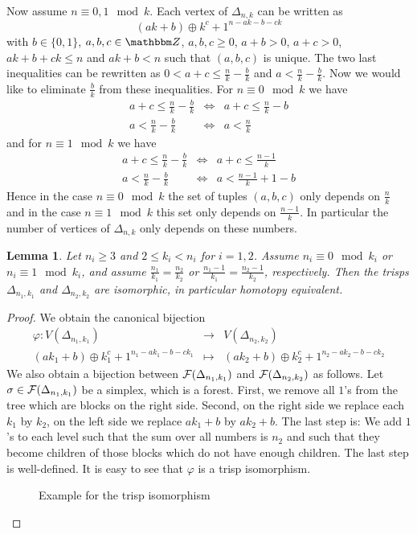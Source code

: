 \documentclass{elsarticle}
\newtheorem{lem}[df]{Lemma}
\def\Z{\mathbbm Z}
\begin{document}
Now assume $n\equiv 0,1\mod k$. Each vertex of $\Delta_{n,k}$ can be written as
\[(ak+b)\oplus k^c+1^{n-ak-b-ck}\]
with $b\in\{0,1\}$, $a,b,c\in\Z$, $a,b,c\geq 0$, $a+b>0$, $a+c>0$, $ak+b+ck\leq n$ and $ak+b<n$ such that $(a,b,c)$ is unique. The two last inequalities can be rewritten as $0<a+c\leq\frac nk-\frac bk$ and $a<\frac nk-\frac bk$. Now we would like to eliminate $\frac bk$ from these inequalities. For $n\equiv 0\mod k$ we have
\begin{eqnarray*}
a+c\leq\frac nk-\frac bk&\Leftrightarrow&a+c\leq\frac nk-b\\
a<\frac nk-\frac bk&\Leftrightarrow&a<\frac nk
\end{eqnarray*}
and for $n\equiv 1\mod k$ we have
\begin{eqnarray*}
a+c\leq\frac nk-\frac bk&\Leftrightarrow&a+c\leq\frac {n-1}k\\
a<\frac nk-\frac bk&\Leftrightarrow&a<\frac {n-1}k+1-b
\end{eqnarray*}
Hence in the case $n\equiv 0\mod k$ the set of tuples $(a,b,c)$ only depends on $\frac nk$ and in the case $n\equiv 1\mod k$ this set only depends on $\frac {n-1}k$. In particular the number of vertices of $\Delta_{n,k}$ only depends on these numbers.
\begin{lem}
\label{trispiso}
Let $n_i\geq3$ and $2\leq k_i<n_i$ for $i=1,2$. Assume $n_i\equiv 0\mod k_i$ or $n_i\equiv 1\mod k_i$, and assume $\frac{n_1}{k_1}=\frac{n_2}{k_2}$ or $\frac{n_1-1}{k_1}=\frac{n_2-1}{k_2}$, respectively. Then the trisps $\Delta_{n_1,k_1}$ and $\Delta_{n_2,k_2}$ are isomorphic, in particular homotopy equivalent.
\end{lem}
\begin{proof}
We obtain the canonical bijection
\begin{eqnarray*}
\varphi:V(\Delta_{n_1,k_1})&\longrightarrow&V(\Delta_{n_2,k_2})\\
(ak_1+b)\oplus k_1^c+1^{n_1-ak_1-b-ck_1}&\longmapsto&(ak_2+b)\oplus k_2^c+1^{n_2-ak_2-b-ck_2}
\end{eqnarray*}
We also obtain a bijection between ${\cal F}(\Delta_{n_1,k_1})$ and ${\cal F}(\Delta_{n_2,k_2})$ as follows. Let $\sigma\in{\cal F}(\Delta_{n_1,k_1})$ be a simplex, which is a forest. First, we remove all $1$'s from the tree which are blocks on the right side. Second, on the right side we replace each $k_1$ by $k_2$, on the left side we replace $ak_1+b$ by $ak_2+b$. The last step is: We add $1$'s to each level such that the sum over all numbers is $n_2$ and such that they become children of those blocks which do not have enough children. The last step is well-defined. It is easy to see that $\varphi$ is a trisp isomorphism.
\begin{figure}[ht]
\centering

\caption{Example for the trisp isomorphism}
\end{figure}
\end{proof}
\end{document}
